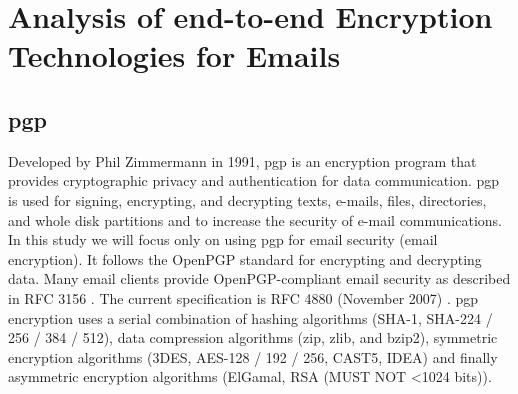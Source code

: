 \section{Analysis of end-to-end Encryption Technologies for Emails}
\label{chap:analysis-encryption}

\subsection{ \acrfull{pgp} }
\label{chap:analysis-pgp}

Developed by Phil Zimmermann in 1991, \acrfull{pgp} is an encryption program that provides cryptographic privacy and authentication for data communication. \acrshort{pgp} is used for signing, encrypting, and decrypting texts, e-mails, files, directories, and whole disk partitions and to increase the security of e-mail communications. In this study we will focus only on using \acrshort{pgp} for \acrshort{email} security (\acrshort{email} encryption). It follows the OpenPGP standard for encrypting and decrypting data. Many \acrshort{email} clients provide OpenPGP-compliant \acrshort{email} security as described in RFC 3156 \cite{rfc3156}. The current specification is RFC 4880 (November 2007) \cite{rfc4880}. \acrshort{pgp} encryption uses a serial combination of hashing algorithms (SHA-1, SHA-224 / 256 / 384 / 512), data compression algorithms (zip, zlib, and bzip2), symmetric encryption algorithms (3DES, AES-128 / 192 / 256, CAST5, IDEA) and finally asymmetric encryption algorithms (ElGamal, RSA (MUST NOT <1024 bits)).

